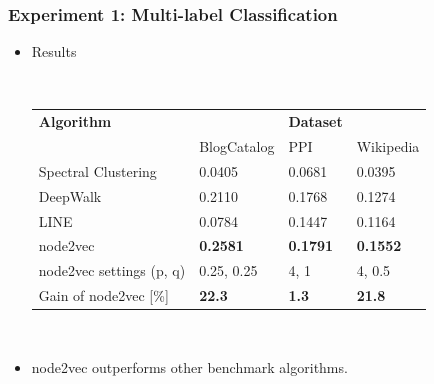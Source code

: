 \documentclass[notes, 10pt, aspectratio=169]{beamer}
\begin{document}
\begin{frame}
    \frametitle{Experiment 1: Multi-label Classification}
    \begin{itemize}
        \item Results\par
            ~\\
            \begin{tabular}{llll}
                \toprule
                \textbf{Algorithm} & & \textbf{Dataset} &\\
                             & BlogCatalog & PPI & Wikipedia\\
                \midrule
                Spectral Clustering & 0.0405 & 0.0681 & 0.0395\\
                DeepWalk & 0.2110 & 0.1768 & 0.1274\\
                LINE & 0.0784 & 0.1447 & 0.1164\\
                node2vec & \textbf{0.2581} & \textbf{0.1791} & \textbf{0.1552}\\
                \midrule
                node2vec settings (p, q) & 0.25, 0.25 & 4, 1 & 4, 0.5\\
                Gain of node2vec [\%] & \textbf{22.3} & \textbf{1.3} & \textbf{21.8}\\
                \bottomrule
            \end{tabular}
            \par~\\
        \item node2vec outperforms other benchmark algorithms.
    \end{itemize}
\end{frame}
\end{document}
